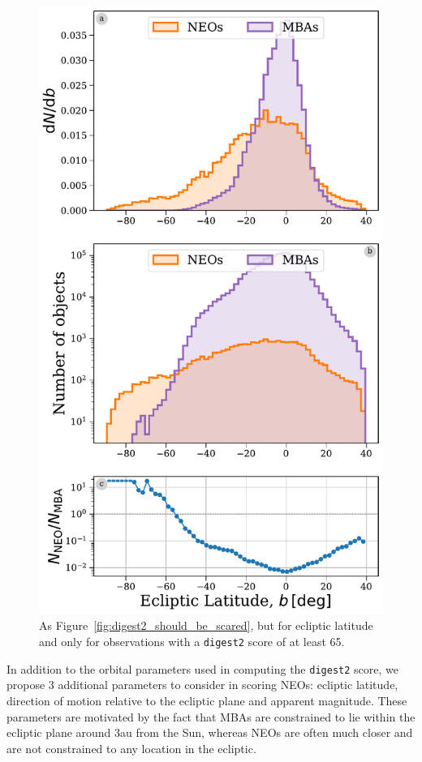 \documentclass[preprint2, twocolappendix]{aastex631}
\newcommand{\dig}{\texttt{digest2}}
\begin{document}
\begin{figure}[htb]
    \centering
    \includegraphics[width=\columnwidth]{figures/ecliptic_latitude_dist_highscore.pdf}
    \caption{As Figure~\ref{fig:digest2_should_be_scared}, but for ecliptic latitude and only for observations with a \dig{} score of at least 65.}
    \label{fig:ecl_lat_highscore}
\end{figure}

In addition to the orbital parameters used in computing the \dig{} score, we propose 3 additional parameters to consider in scoring NEOs: ecliptic latitude, direction of motion relative to the ecliptic plane and apparent magnitude. These parameters are motivated by the fact that MBAs are constrained to lie within the ecliptic plane around 3au from the Sun, whereas NEOs are often much closer and are not constrained to any location in the ecliptic.
\end{document}
